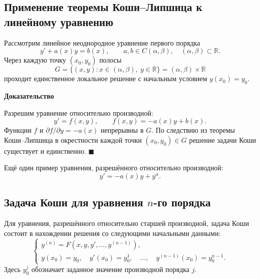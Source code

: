 \documentclass[12pt,a4paper]{article}
\numberwithin{equation}{section}
\newcommand{\R}{\mathbb{R}}
\renewenvironment{proof}[1][Доказательство]{\begin{center}\textbf{#1}\end{center}}{\hfill$\blacksquare$\par}
\begin{document}
\subsection{Применение теоремы Коши--Липшица к линейному уравнению}

Рассмотрим линейное неоднородное уравнение первого порядка
\[
 y'+a(x)y=b(x),\qquad a,b\in C(\alpha,\beta),\quad (\alpha,\beta)\subset\R.
\]
Через каждую точку \((x_0,y_0)\) полосы
\[
 G=\{(x,y):x\in(\alpha,\beta),\ y\in\R\}=(\alpha,\beta)\times\R
\]
проходит единственное локальное решение с начальным условием \(y(x_0)=y_0\).

\begin{center}
\end{center}

\begin{proof}
Разрешим уравнение относительно производной:
\[
 y'=f(x,y),\qquad f(x,y)=-a(x)y+b(x).
\]
Функции \(f\) и \(\partial f/\partial y=-a(x)\) непрерывны в \(G\).
По следствию из теоремы Коши--Липшица в окрестности каждой точки
\((x_0,y_0)\in G\) решение задачи Коши существует и единственно.
\end{proof}

Ещё один пример уравнения, разрешённого относительно производной:
\[
 y'=-a(x)y+y^\alpha.
\]

\subsection{Задача Коши для уравнения \texorpdfstring{\(n\)}{n}-го порядка}

Для уравнения, разрешённого относительно старшей производной, задача
Коши состоит в нахождении решения со следующими начальными данными:
\[
 \begin{cases}
 y^{(n)}=F(x,y,y',\ldots,y^{(n-1)}),\\
 y(x_0)=y_0,\quad y'(x_0)=y_0^1,\quad\ldots,\quad
 y^{(n-1)}(x_0)=y_0^{n-1}.
 \end{cases}
\]
Здесь \(y_0^j\) обозначает заданное значение производной порядка \(j\).
\end{document}
